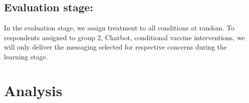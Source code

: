 \documentclass[letterpaper, 12pt, parskip=full,DIV=10]{scrartcl}
\begin{document}
%

\subsection{Evaluation stage:}
In the evaluation stage, we assign treatment to all conditions at random. To respondents assigned to group 2, Chatbot, conditional vaccine interventions, we will only deliver the messaging selected for respective concerns during the learning stage. 



\section{Analysis}

\clearpage


\clearpage
\appendix
\end{document}
